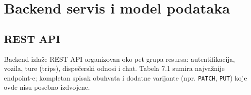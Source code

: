 \chapter{Backend servis i model podataka}

\section{REST API}

Backend izlaže REST API organizovan oko pet grupa resursa: autentifikacija, vozila, ture (trips), dispečerski odnosi i chat. Tabela 7.1 sumira najvažnije endpoint-e; kompletan spisak obuhvata i dodatne varijante (npr. \texttt{PATCH}, \texttt{PUT}) koje ovde nisu posebno izdvojene.

\setlength{\tabcolsep}{4pt}
\renewcommand{\arraystretch}{1.3}

